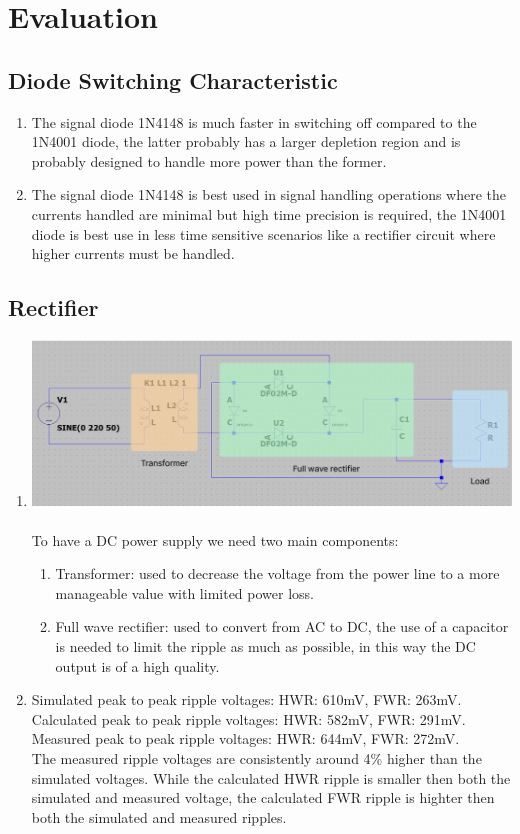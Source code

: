 \documentclass{article}
\begin{document}
		\section{Evaluation}
			\subsection{Diode Switching Characteristic}
				\begin{enumerate}
					\item The signal diode 1N4148 is much faster in switching off compared to the 1N4001 diode, the latter probably has a larger depletion region and is probably designed to handle more power than the former. 
					\item The signal diode 1N4148 is best used in signal handling operations where the currents handled are minimal but high time precision is required, the 1N4001 diode is best use in less time sensitive scenarios like a rectifier circuit where higher currents must be handled.
				\end{enumerate}
			\subsection{Rectifier}
				\begin{enumerate}
					\item \includegraphics[scale=0.35]{power supply schematic}\\\\
					To have a DC power supply we need two main components:
						\begin{enumerate}
							\item Transformer: used to decrease the voltage from the power line to a more manageable value with limited power loss.
							\item Full wave rectifier: used to convert from AC to DC, the use of a capacitor is needed to limit the ripple as much as possible, in this way the DC output is of a high quality.
						\end{enumerate}
					\item Simulated peak to peak ripple voltages: HWR: 610mV, FWR: 263mV. Calculated peak to peak ripple voltages: HWR: 582mV, FWR: 291mV. Measured peak to peak ripple voltages: HWR: 644mV, FWR: 272mV.\\
					The measured ripple voltages are consistently around 4\% higher than the simulated voltages. While the calculated HWR ripple is smaller then both the simulated and measured voltage, the calculated FWR ripple is highter then both the simulated and measured ripples.
				\end{enumerate}
\end{document}
